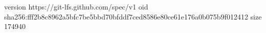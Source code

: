 version https://git-lfs.github.com/spec/v1
oid sha256:fff2b8c8962a5bfc7be5bbd70bfddf7ced8586e80ce61e176a0b075b9f012412
size 174940
